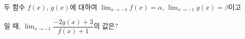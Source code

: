 두 함수 $f(x)$, $g(x)$에 대하여 $\displaystyle\lim_{x\to -1} f(x)=\alpha$, $\displaystyle\lim_{x\to -1} g(x)=\beta$이고\par\smallskip{}\par\smallskip\noindent 일 때, $\displaystyle\lim_{x\to -1}\dfrac{-2g(x)+3}{f(x)+1}$의 값은? \dmcondfill{$\alpha<\beta$}{}
